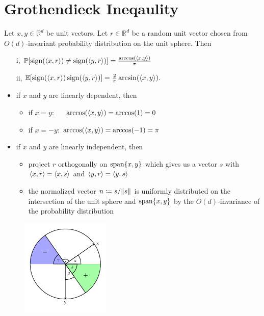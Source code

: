 \section{Grothendieck Ineqaulity}

\begin{frame}
	\begin{lemma}\label{lem:G_id}
		Let $x,y\in\mathbb{R}^d$ be unit vectors. Let $r\in\mathbb{R}^d$ be a random unit vector chosen from $O(d)$-invariant probability distribution on the unit sphere. Then
		\begin{enumerate}
			\item[i,] $\mathbb{P}[\operatorname{sign}(\langle{x},{r}\rangle)\neq\operatorname{sign}(\langle{y},{r}\rangle)]=\frac{\arccos(\langle{x},{y}\rangle)}{\pi}$
			\item[ii,] $\mathbb{E}[\operatorname{sign}(\langle{x},{r}\rangle)\operatorname{sign}(\langle{y},{r}\rangle)]=\frac{2}{\pi}\arcsin(\langle{x},{y}\rangle).$
		\end{enumerate}
	\end{lemma}
	\begin{pbmr}
		\begin{itemize}
			\item<1-> if $x$ and $y$ are linearly dependent, then
				\begin{itemize}
					\item<2-> if $x=y$:~~\, $\arccos(\langle{x},{y}\rangle)=\arccos(1) = 0$
					\item<3-> if $x=-y$: $\arccos(\langle{x},{y}\rangle)=\arccos(-1) = \pi$
				\end{itemize}
			\item<4-> if $x$ and $y$ are linearly independent, then 
				\begin{itemize}
					\item<5-> project $r$ orthogonally on $\operatorname{span}\{x,y\}$ which gives us a vector $s$ with $\langle{x},{r}\rangle = \langle{x},{s}\rangle$ and $\langle{y},{r}\rangle = \langle{y},{s}\rangle$
					\item<6-> the normalized vector $n\coloneqq s/ \Vert {s} \Vert$ is uniformly distributed on the intersection of the unit sphere and $\operatorname{span}\{x,y\}$ by the $O(d)$-invariance of the probability distribution
				\end{itemize}
		\end{itemize}
	\end{pbmr}
\end{frame}

\begin{frame}
	\begin{pbmr}
		\begin{figure}
			\begin{center}
				\includegraphics[width=0.38\textwidth]{ChapersPresentation/fig_unit_circle.pdf}
			\end{center}
		\end{figure}
	\end{pbmr}
\end{frame}